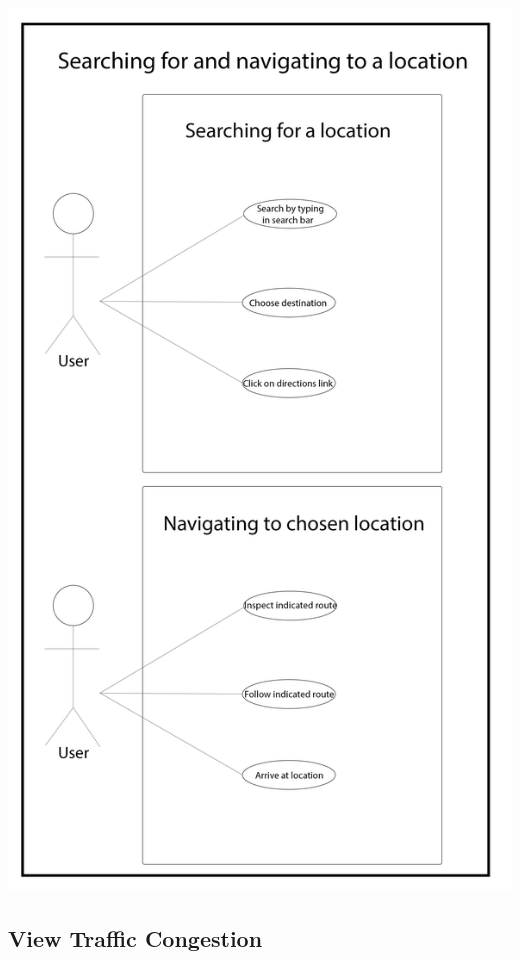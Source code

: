 \documentclass[12pt]{article}
\begin{document}
\includegraphics[scale=0.5]{SandN.png}


\label{UML diagram}



	

	

	\subsection{View Traffic Congestion}
\end{document}
